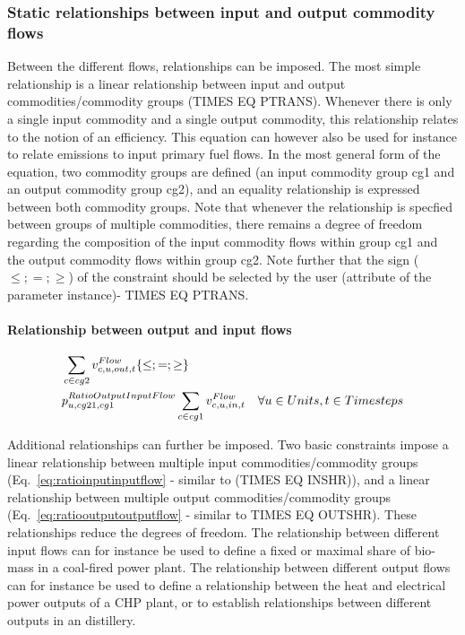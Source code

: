 \subsubsection{Static relationships between input and output commodity flows}
Between the different flows, relationships can be imposed. The most simple relationship is a linear relationship between input and output commodities/commodity groups (TIMES EQ PTRANS). Whenever there is only a single input commodity and a single output commodity, this relationship relates to the notion of an efficiency. This equation can however also be used for instance to relate emissions to input primary fuel flows. In the most general form of the equation, two commodity groups are defined (an input commodity group cg1 and an output commodity group cg2), and an equality relationship is expressed between both commodity groups. Note that whenever the relationship is specfied between groups of multiple commodities, there remains a degree of freedom regarding the composition of the input commodity flows within group cg1 and the output commodity flows within group cg2. Note further that the sign ($\le;=;\ge$) of the constraint should be selected by the user (attribute of the parameter instance)- TIMES EQ PTRANS. 

\paragraph{Relationship between output and input flows}
\begin{align} \label{eq:ratiooutputinputflow}
&\sum_{\commodity \in cg2} \vFlow[\commodity,\unit,out,\timestep] \{\le;=;\ge\} \nonumber \\
&\pRatioOutputInputFlow \sum_{\commodity \in cg1} \vFlow[\commodity,\unit,in,\timestep] \quad \forall \units, \timesteps
\end{align}

Additional relationships can further be imposed. Two basic constraints impose a linear relationship between multiple input commodities/commodity groups (Eq.~\eqref{eq:ratioinputinputflow} - similar to (TIMES EQ INSHR)), and a linear relationship between multiple output commodities/commodity groups (Eq.~\eqref{eq:ratiooutputoutputflow} - similar to TIMES EQ OUTSHR). These relationships reduce the degrees of freedom. The relationship between different input flows can for instance be used to define a fixed or maximal share of bio-mass in a coal-fired power plant. The relationship between different output flows can for instance be used to define a relationship between the heat and electrical power outputs of a CHP plant, or to establish relationships between different outputs in an distillery. 

